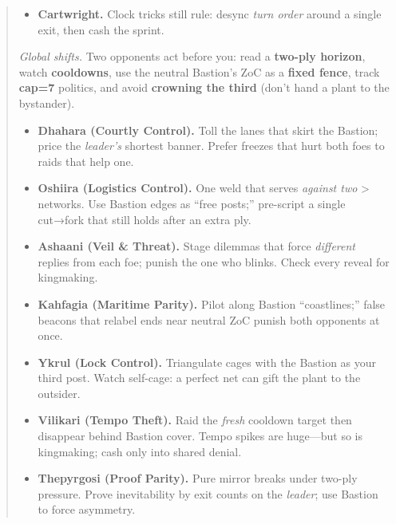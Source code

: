 \documentclass[11pt]{article}
\begin{document}
\begin{quote}
\begin{tcolorbox}[enhanced,breakable,title={2$\times$4 Micro-Strip — What Survives},
  colback=white,colframe=royal,boxrule=0.8pt]
\begin{itemize}[leftmargin=1.1em,itemsep=0.3em]
\item \textbf{Cartwright.} Clock tricks still rule: desync \emph{turn order} around a single exit, then cash the sprint.
\end{itemize}
\end{tcolorbox}

\begin{tcolorbox}[enhanced,breakable,title={Triad (3-Player, Bastion) — What Changes},
  colback=white,colframe=royal,boxrule=0.8pt]
\small
\noindent \textit{Global shifts.} Two opponents act before you: read a \textbf{two-ply horizon}, watch \textbf{cooldowns}, use the neutral Bastion’s ZoC as a \textbf{fixed fence}, track \textbf{cap=7} politics, and avoid \textbf{crowning the third} (don’t hand a plant to the bystander).

\begin{itemize}[leftmargin=1.1em,itemsep=0.3em]

\item \textbf{Dhahara (Courtly Control).} Toll the lanes that skirt the Bastion; price the \emph{leader’s} shortest banner. Prefer freezes that hurt both foes to raids that help one.

\item \textbf{Oshiira (Logistics Control).} One weld that serves \emph{against two} > networks. Use Bastion edges as “free posts;” pre-script a single cut→fork that still holds after an extra ply.

\item \textbf{Ashaani (Veil \& Threat).} Stage dilemmas that force \emph{different} replies from each foe; punish the one who blinks. Check every reveal for kingmaking.

\item \textbf{Kahfagia (Maritime Parity).} Pilot along Bastion “coastlines;” false beacons that relabel ends near neutral ZoC punish both opponents at once.

\item \textbf{Ykrul (Lock Control).} Triangulate cages with the Bastion as your third post. Watch self-cage: a perfect net can gift the plant to the outsider.

\item \textbf{Vilikari (Tempo Theft).} Raid the \emph{fresh} cooldown target then disappear behind Bastion cover. Tempo spikes are huge—but so is kingmaking; cash only into shared denial.

\item \textbf{Thepyrgosi (Proof Parity).} Pure mirror breaks under two-ply pressure. Prove inevitability by exit counts on the \emph{leader}; use Bastion to force asymmetry.


\end{itemize}
\end{tcolorbox}
\end{quote}
\end{document}
